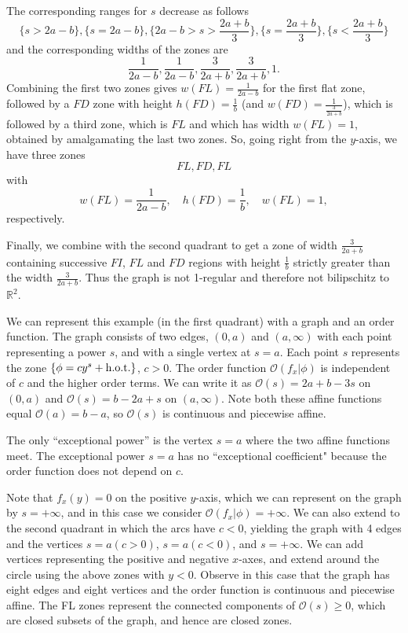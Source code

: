 \documentclass[article]{amsart}
\newcommand{\R}{\mathbb R}
\newcommand{\0}{{\bf 0}}
\begin{document}
The corresponding ranges for $s$ decrease as follows
$$
\{s>2a-b\}, \{s=2a-b\}, \{2a-b>s>\frac{2a+b}{3}\}, \{s = \frac{2a+b}{3} \}, \{s < \frac{2a+b}{3} \}
$$
and the corresponding widths of the zones are
$$
\frac{1}{2a-b}, \frac{1}{2a-b}, \frac{3}{2a+b}, \frac{3}{2a+b}, 1.
$$ 
Combining the first two zones gives $w(FL) =\frac{1}{2a-b}$ for the first flat zone, followed by a $FD$ zone with height
$h(FD) = \frac{1}{b}$ (and $w(FD) = \frac{1}{\frac{3}{2a+b}}$), which is followed by a third zone, which is $FL$ and which has width $w(FL) = 1$, obtained by amalgamating the last two zones.  So, going right from the $y$-axis, we have three zones
$$FL, FD, FL$$
with
$$w(FL) = \frac{1}{2a-b},\quad h(FD) = \frac{1}{b},\quad w(FL) = 1,$$
respectively.  

Finally, we combine with the second quadrant to get a zone of width $\frac{3}{2a+b}$ containing successive $FI$, $FL$ and $FD$ regions with height 
$\frac{1}{b}$ strictly greater than the width $\frac{3}{2a+b}$.  Thus the graph is not 1-regular and therefore not bilipschitz to $\R^2$. 

 
 We can represent this example (in the first quadrant) with a graph and an order function. The graph consists of two edges, $(0,a)$ and $(a,\infty)$ with each point representing a power $s$, and with a single vertex at $s=a$. Each point $s$ represents the zone $\{\phi =  cy^s + {\rm h.o.t.}\}$, $c>0$.  The order function $\mathcal{O}(f_x|\phi)$ is independent of $c$ and the higher order terms.  We can write it as  $\mathcal{O}(s)= 2a+b-3s$ on  $(0,a)$ and $\mathcal{O}(s)= b-2a+s$ on $(a,\infty)$.  Note both these affine functions equal $\mathcal{O}(a)=b-a$, 
 so $\mathcal{O}(s)$ is continuous and piecewise affine.
 
 The only ``exceptional power'' is the vertex $s=a$ where the two affine functions meet.  The exceptional power $s=a$ has no ``exceptional coefficient" because the order function does not depend on $c$. 
 
 Note that $f_x(y)=0$ on the positive $y$-axis, which we can represent on the graph by $s=+\infty$, and in this case we consider $\mathcal{O}(f_x|\phi) =+\infty$.  We can also extend to the second quadrant in which the arcs have $c<0$, yielding the graph with 4 edges and the vertices $s= a (c>0)$, $s= a (c<0)$, and $s= +\infty$.  We can add vertices representing the  positive and negative $x$-axes,
 and extend around the circle using the above zones with $y<0$.  Observe in this case that the graph has eight edges and eight vertices and the order function is continuous and piecewise affine.  The FL zones represent the connected components of  $\mathcal{O}(s)\ge 0$, which are closed subsets of the graph, and hence are closed zones.
 
\end{document}

